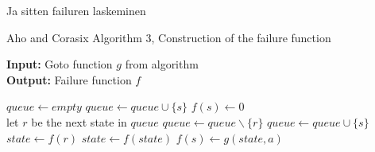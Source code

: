 \documentclass[english,twoside,censored,csm,algorithms-track-2020]{HYthesisML}
\theoremstyle{plain}
\theoremstyle{definition}
\begin{document}
  Ja sitten failuren laskeminen

  \begin{algorithm}

    \caption{Aho and Corasix Algorithm 3, Construction of the failure function} \label{ac-fail}
    \hspace*{\algorithmicindent} \textbf{Input:} Goto function $g$ from algorithm\\ %
    \hspace*{\algorithmicindent} \textbf{Output:} Failure function $f$

    \begin{algorithmic}[1]
        \State $queue\gets \textit{empty}$
          \State $queue\gets queue \cup \{s\}$
          \State $f(s)\gets 0$
        \EndFor
        \\
          \hspace*{\algorithmicindent}let $r$ be the next state in $queue$
          \State $queue\gets queue \backslash \{r\}$
            \State $queue\gets queue \cup \{s\}$
            \State $state\gets f(r)$
              \State $state\gets f(state)$
            \EndWhile
            \State $f(s)\gets g(state,a)$              
          \EndFor
        \EndWhile
          
      \EndFunction

    \end{algorithmic}
  \end{algorithm}
\end{document}
